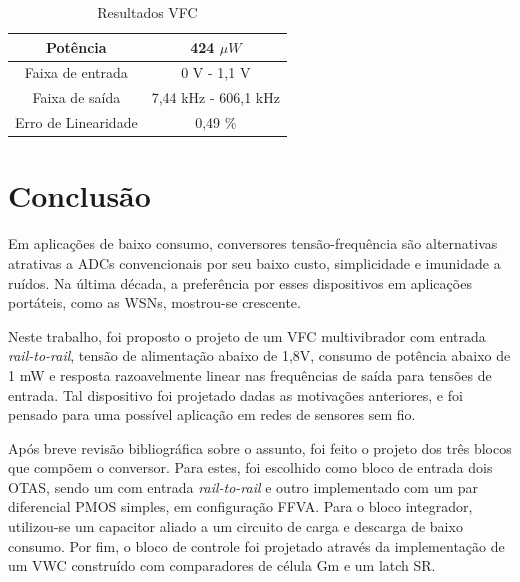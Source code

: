 \documentclass[
	12pt,				%
	oneside,			%
	a4paper,			%
	english,			%
	french,				%
	spanish,			%
	brazil				%
	]{abntex2}
\begin{document}
\begin{table}[h]
    \begin{center}    
    \begin{tabular}{ | c | c | }
    \hline
    Potência  & 424 $\mu W $ \\
    \hline
    Faixa de entrada  & 0 V - 1,1 V \\
    \hline
    Faixa de saída  & 7,44 kHz - 606,1 kHz \\
    \hline
    Erro de Linearidade  & 0,49 \% \\
    \hline
    \end{tabular}
    \caption[Resultados VFC]{Resultados VFC}
    \label{tabVFC}
    \end{center}
\end{table}


\chapter{Conclusão}
Em aplicações de baixo consumo, conversores tensão-frequência são alternativas atrativas a ADCs convencionais por seu baixo custo, simplicidade e imunidade a ruídos. Na última década, a preferência por esses dispositivos em aplicações portáteis, como as WSNs, mostrou-se crescente.

Neste trabalho, foi proposto o projeto de um VFC multivibrador com entrada \textit{rail-to-rail}, tensão de alimentação abaixo de 1,8V, consumo de potência abaixo de 1 mW e resposta razoavelmente linear nas frequências de saída para tensões de entrada. Tal dispositivo foi projetado dadas as motivações anteriores, e foi pensado para uma possível aplicação em redes de sensores sem fio.

Após breve revisão bibliográfica sobre o assunto, foi feito o projeto dos três blocos que compõem o conversor. Para estes, foi escolhido como bloco de entrada dois OTAS, sendo um com entrada \textit{rail-to-rail} e outro implementado com um par diferencial PMOS simples, em configuração FFVA. Para o bloco integrador, utilizou-se um capacitor aliado a um circuito de carga e descarga de baixo consumo. Por fim, o bloco de controle foi projetado através da implementação de um VWC construído com comparadores de célula Gm e um latch SR. 
\end{document}
